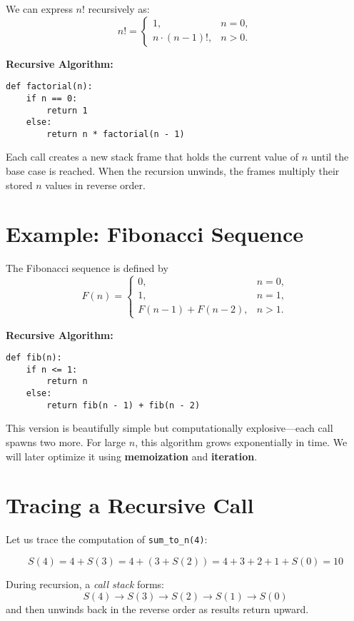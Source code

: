 We can express $n!$ recursively as:
\[
n! =
\begin{cases}
1, & n = 0,\\
n \cdot (n-1)!, & n > 0.
\end{cases}
\]

\noindent
\textbf{Recursive Algorithm:}
\begin{verbatim}
def factorial(n):
    if n == 0:
        return 1
    else:
        return n * factorial(n - 1)
\end{verbatim}

Each call creates a new stack frame that holds the current value of $n$ until the base case is reached.
When the recursion unwinds, the frames multiply their stored $n$ values in reverse order.

\section{Example: Fibonacci Sequence}

The Fibonacci sequence is defined by
\[
F(n) =
\begin{cases}
0, & n = 0,\\
1, & n = 1,\\
F(n-1) + F(n-2), & n > 1.
\end{cases}
\]

\noindent
\textbf{Recursive Algorithm:}
\begin{verbatim}
def fib(n):
    if n <= 1:
        return n
    else:
        return fib(n - 1) + fib(n - 2)
\end{verbatim}

This version is beautifully simple but computationally explosive—each call spawns two more.
For large $n$, this algorithm grows exponentially in time.
We will later optimize it using \textbf{memoization} and \textbf{iteration}.

\section{Tracing a Recursive Call}

Let us trace the computation of \texttt{sum\_to\_n(4)}:

\[
S(4) = 4 + S(3) = 4 + (3 + S(2)) = 4 + 3 + 2 + 1 + S(0) = 10
\]

\noindent
During recursion, a \emph{call stack} forms:
\[
S(4) \rightarrow S(3) \rightarrow S(2) \rightarrow S(1) \rightarrow S(0)
\]
and then unwinds back in the reverse order as results return upward.

